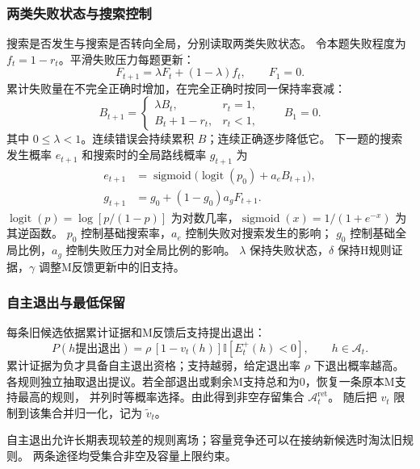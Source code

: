 \documentclass[11pt,a4paper]{article}
\numberwithin{equation}{section}
\newcommand{\ind}{\mathbb{I}}
\newcommand{\logit}{\operatorname{logit}}
\newcommand{\sigmoid}{\operatorname{sigmoid}}
\newcommand{\A}{\mathcal{A}}
\begin{document}
\subsubsection{两类失败状态与搜索控制}
\label{sec:search-control}
搜索是否发生与搜索是否转向全局，分别读取两类失败状态。
令本题失败程度为 $f_t=1-r_t$。平滑失败压力每题更新：
\begin{equation}
F_{t+1}=\lambda F_t+(1-\lambda)f_t,\qquad F_1=0.
\end{equation}
累计失败量在不完全正确时增加，在完全正确时按同一保持率衰减：
\begin{equation}
B_{t+1}=\begin{cases}
\lambda B_t,&r_t=1,\\
B_t+1-r_t,&r_t<1,
\end{cases}\qquad B_1=0.
\label{eq:failure}
\end{equation}
其中 $0\leq\lambda<1$。连续错误会持续累积 $B$；连续正确逐步降低它。
下一题的搜索发生概率 $e_{t+1}$ 和搜索时的全局路线概率 $g_{t+1}$ 为
\begin{align}
e_{t+1}&=\sigmoid\bigl(\logit(p_0)+a_e B_{t+1}\bigr),\\
g_{t+1}&=g_0+(1-g_0)a_gF_{t+1}.
\label{eq:search-control}
\end{align}
$\logit(p)=\log[p/(1-p)]$ 为对数几率，$\sigmoid(x)=1/(1+e^{-x})$ 为其逆函数。
$p_0$ 控制基础搜索率，$a_e$ 控制失败对搜索发生的影响；
$g_0$ 控制基础全局比例，$a_g$ 控制失败压力对全局比例的影响。
$\lambda$ 保持失败状态，$\delta$ 保持H规则证据，$\gamma$ 调整M反馈更新中的旧支持。

\subsubsection{自主退出与最低保留}
\label{sec:exit}
每条旧候选依据累计证据和M反馈后支持提出退出：
\begin{equation}
P(h\text{提出退出})=\rho\,[1-v_t(h)]\ind[E_t^+(h)<0],\qquad h\in\A_t.
\label{eq:exit}
\end{equation}
累计证据为负才具备自主退出资格；支持越弱，给定退出率 $\rho$ 下退出概率越高。
各规则独立抽取退出提议。若全部退出或剩余M支持总和为0，恢复一条原本M支持最高的规则，
并列时等概率选择。由此得到非空存留集合 $\A_t^{\mathrm{ret}}$。
随后把 $v_t$ 限制到该集合并归一化，记为 $\widetilde v_t$。

自主退出允许长期表现较差的规则离场；容量竞争还可以在接纳新候选时淘汰旧规则。
两条途径均受集合非空及容量上限约束。
\end{document}
